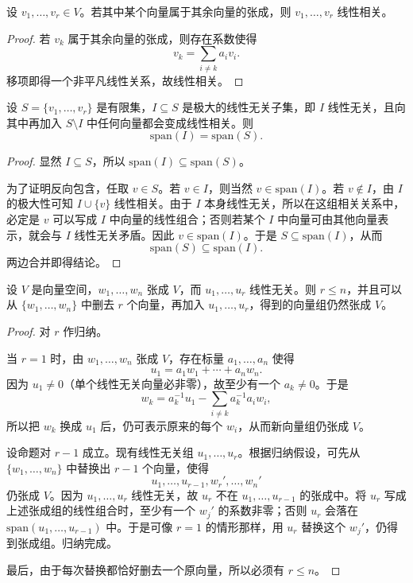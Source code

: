 \begin{corollary}
设 $v_1,\dots,v_r\in V$。若其中某个向量属于其余向量的张成，则 $v_1,\dots,v_r$ 线性相关。
\end{corollary}

\begin{proof}
若 $v_k$ 属于其余向量的张成，则存在系数使得
\[
v_k=\sum_{i\ne k} a_i v_i.
\]
移项即得一个非平凡线性关系，故线性相关。
\end{proof}

\begin{proposition}[极大线性无关组张成同一空间]
设 $S=\{v_1,\dots,v_r\}$ 是有限集，$I\subseteq S$ 是极大的线性无关子集，即 $I$ 线性无关，且向其中再加入 $S\setminus I$ 中任何向量都会变成线性相关。则
\[
\mathrm{span}(I)=\mathrm{span}(S).
\]
\end{proposition}

\begin{proof}
显然 $I\subseteq S$，所以 $\mathrm{span}(I)\subseteq\mathrm{span}(S)$。

为了证明反向包含，任取 $v\in S$。若 $v\in I$，则当然 $v\in\mathrm{span}(I)$。若 $v\notin I$，由 $I$ 的极大性可知 $I\cup\{v\}$ 线性相关。由于 $I$ 本身线性无关，所以在这组相关关系中，必定是 $v$ 可以写成 $I$ 中向量的线性组合；否则若某个 $I$ 中向量可由其他向量表示，就会与 $I$ 线性无关矛盾。因此 $v\in\mathrm{span}(I)$。于是 $S\subseteq\mathrm{span}(I)$，从而
\[
\mathrm{span}(S)\subseteq\mathrm{span}(I).
\]
两边合并即得结论。
\end{proof}

\begin{theorem}[替换引理]
设 $V$ 是向量空间，$w_1,\dots,w_n$ 张成 $V$，而 $u_1,\dots,u_r$ 线性无关。则 $r\le n$，并且可以从 $\{w_1,\dots,w_n\}$ 中删去 $r$ 个向量，再加入 $u_1,\dots,u_r$，得到的向量组仍然张成 $V$。
\end{theorem}

\begin{proof}
对 $r$ 作归纳。

当 $r=1$ 时，由 $w_1,\dots,w_n$ 张成 $V$，存在标量 $a_1,\dots,a_n$ 使得
\[
u_1=a_1w_1+\cdots+a_nw_n.
\]
因为 $u_1\ne 0$（单个线性无关向量必非零），故至少有一个 $a_k\ne 0$。于是
\[
w_k=a_k^{-1}u_1-\sum_{i\ne k} a_k^{-1}a_i w_i,
\]
所以把 $w_k$ 换成 $u_1$ 后，仍可表示原来的每个 $w_i$，从而新向量组仍张成 $V$。

设命题对 $r-1$ 成立。现有线性无关组 $u_1,\dots,u_r$。根据归纳假设，可先从 $\{w_1,\dots,w_n\}$ 中替换出 $r-1$ 个向量，使得
\[
u_1,\dots,u_{r-1},w_r',\dots,w_n'
\]
仍张成 $V$。因为 $u_1,\dots,u_r$ 线性无关，故 $u_r$ 不在 $u_1,\dots,u_{r-1}$ 的张成中。将 $u_r$ 写成上述张成组的线性组合时，至少有一个 $w_j'$ 的系数非零；否则 $u_r$ 会落在 $\mathrm{span}(u_1,\dots,u_{r-1})$ 中。于是可像 $r=1$ 的情形那样，用 $u_r$ 替换这个 $w_j'$，仍得到张成组。归纳完成。

最后，由于每次替换都恰好删去一个原向量，所以必须有 $r\le n$。
\end{proof}

